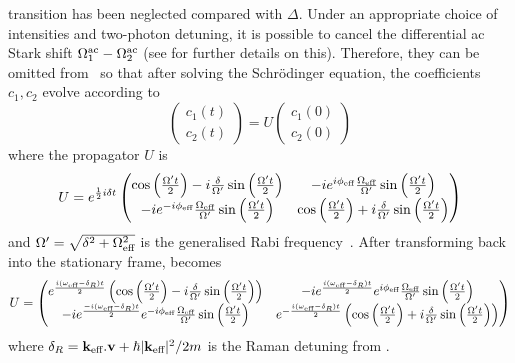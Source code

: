  transition has been neglected compared with $\Delta$.
Under an appropriate choice of intensities and two-photon detuning, it
is possible to cancel the differential ac Stark shift
$\Omega_1^\textnormal{ac} -\Omega_2^\textnormal{ac}$ (see
 for further details on this).
Therefore, they can be omitted from~ so that
after solving the Schr\"odinger equation, the coefficients $c_1,c_2$
evolve according to 
\begin{equation}
  \label{eq:schrodinger_prop}
  \begin{pmatrix} c_1(t) \\ c_2(t)\end{pmatrix} = U \begin{pmatrix}
c_1(0) \\ c_2(0)\end{pmatrix}
\end{equation}
where the propagator $U$ is
\begin{equation}
  U = e^{\frac{1}{2}i\delta t } \begin{pmatrix} 
  \cos \left(\frac{ \Omega' t}{2}\right)-i\frac{\delta}{\Omega'}\sin
  \left(\frac{\Omega' t}{2}\right) & 
 -i e^{i \phi_\textnormal{eff}} \frac{
 \Omega_\textnormal{eff}}{\Omega'} \sin \left(\frac{\Omega'
 t}{2}\right) \\ 
  -i e^{-i \phi_\textnormal{eff}} \frac{
  \Omega_\textnormal{eff}}{\Omega'} \sin \left(\frac{\Omega'
t}{2}\right)& \cos \left(\frac{ \Omega' t}{2}\right)+i\frac{
\delta  }{\Omega'}\sin \left(\frac{ \Omega' t}{2}\right) \\
\end{pmatrix}
\label{eq:propagator_first}
\end{equation}
and $\Omega' = \sqrt{\delta^2 + \Omega_\textnormal{eff}^2}$ is the
generalised Rabi frequency~\cite{Ramsey1950}. After transforming back into the
stationary frame,  becomes
\begin{equation}
U =  \begin{pmatrix} 
  e^{\frac{i(\omega_\textnormal{eff}-\delta_R)t}{2}  }\left(\cos \left(\frac{ \Omega' t}{2}\right)-i\frac{\delta}{\Omega'}\sin
  \left(\frac{\Omega' t}{2}\right)\right) & 
 -i e^{\frac{i(\omega_\textnormal{eff}-\delta_R)t}{2}  }e^{i \phi_\textnormal{eff}} \frac{
 \Omega_\textnormal{eff}}{\Omega'} \sin \left(\frac{\Omega'
 t}{2}\right) \\ 
  -i e^{\frac{-i(\omega_\textnormal{eff}-\delta_R)t}{2}  }e^{-i \phi_\textnormal{eff}} \frac{
  \Omega_\textnormal{eff}}{\Omega'} \sin \left(\frac{\Omega'
  t}{2}\right)& e^{-\frac{i(\omega_\textnormal{eff}-\delta_R)t}{2}  }\left(\cos \left(\frac{ \Omega' t}{2}\right)+i\frac{
\delta  }{\Omega'}\sin \left(\frac{ \Omega' t}{2}\right)\right) \\
\end{pmatrix}
\label{eq:propagator_stationary}
\end{equation}  
where $\delta_R = {\textbf k_\textnormal{eff}}.\textbf{v} + \hbar |{\textbf k_\textnormal{eff}}|^2/2m$ is the Raman
detuning from
.
